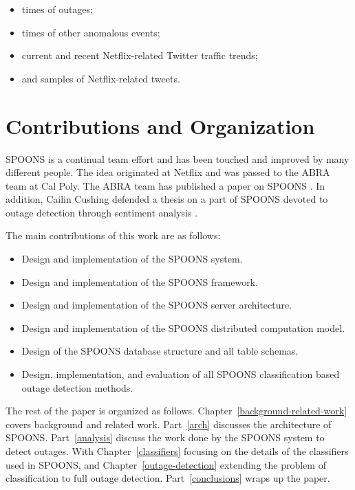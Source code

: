 \documentclass[12pt]{ucthesis}
\begin{document}
\begin{itemize}
   \item times of outages;
   \item times of other anomalous events;
   \item current and recent Netflix-related Twitter traffic trends;
   \item and samples of Netflix-related tweets.
\end{itemize}

\chapter{Contributions and Organization}
\label{contributions-organization}

SPOONS is a continual team effort and has been touched and improved by many different people.
The idea originated at Netflix and was passed to the ABRA team at Cal Poly.
The ABRA team has published a paper on SPOONS \cite{abraPaper}.
In addition, Cailin Cushing defended a thesis on a part of SPOONS devoted to outage detection through sentiment analysis \cite{cailinThesis}.

The main contributions of this work are as follows:
\begin{itemize}
   \item Design and implementation of the SPOONS system.
   \item Design and implementation of the SPOONS framework.
   \item Design and implementation of the SPOONS server architecture.
   \item Design and implementation of the SPOONS distributed computation model.
   \item Design of the SPOONS database structure and all table schemas.
   \item Design, implementation, and evaluation of all SPOONS classification based outage detection methods.
\end{itemize}

The rest of the paper is organized as follows.
Chapter~\ref{background-related-work} covers background and related work.
Part~\ref{arch} discusses the architecture of SPOONS.
Part~\ref{analysis} discuss the work done by the SPOONS system to detect outages.
With Chapter~\ref{classifiers} focusing on the details of the classifiers used in SPOONS, and
Chapter~\ref{outage-detection} extending the problem of classification to full outage detection.
Part~\ref{conclusions} wraps up the paper.
\end{document}
